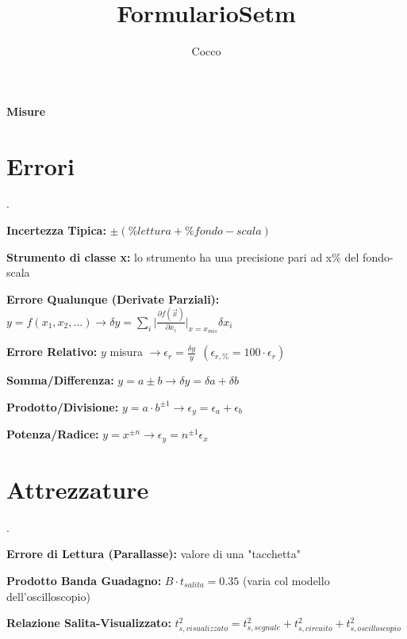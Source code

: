 \documentclass[12pt]{extarticle}
\title{FormularioSetm}
\author{{Cocco}}
\date{}
\begin{document}
\thispagestyle{empty}
{\bf \huge Misure}
\section{Errori}.


{\bf Incertezza Tipica:} $\pm (\% lettura + \% fondo-scala) $

{\bf Strumento di classe x:} lo strumento ha una precisione pari ad x\% del fondo-scala


{\bf Errore Qualunque (Derivate Parziali):} $\displaystyle y = f(x_1, x_2, ...) \to \delta y  = \sum_i \Bigg |\frac{\partial f(\vec{x})}{\partial x_i}\Bigg |_{x=x_{mis}} \delta x_i $

{\bf Errore Relativo:} $y$ misura $\displaystyle\to \epsilon_r = \frac{\delta y}{y} \ \ (\epsilon_{r, \%} = 100\cdot\epsilon_r)$

{\bf Somma/Differenza:} $y = a \pm b \to \delta y = \delta a + \delta b$


{\bf Prodotto/Divisione:} $\displaystyle y = a\cdot b^{\pm 1} \to \epsilon_y = \epsilon_a + \epsilon_b$

{\bf Potenza/Radice:} $\displaystyle y = x^{\pm n} \to \epsilon_y = n^{\pm 1}\epsilon_x$

\section{Attrezzature}. 





{\bf Errore di Lettura (Parallasse):} valore di una "tacchetta"

{\bf Prodotto Banda Guadagno:} $ B\cdot t_{salita} = 0.35 $ (varia col modello dell'oscilloscopio)

{\bf Relazione Salita-Visualizzato:} $\displaystyle t_{s, visualizzato}^2 = t_{s, segnale}^2 + t_{s, circuito}^2 + t_{s, oscilloscopio}^2$
\end{document}
